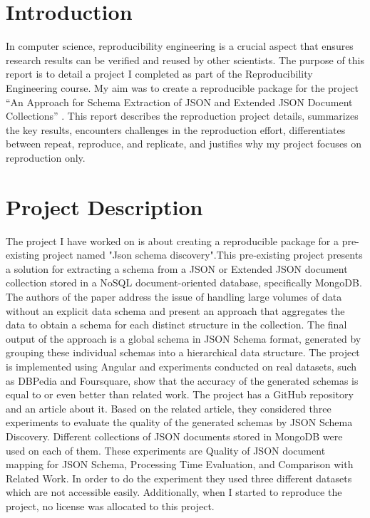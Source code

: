 \documentclass[sigconf]{acmart}
\begin{document}
% 
\section*{Introduction}
In computer science, reproducibility engineering is a crucial aspect that ensures research results can be verified and reused by other scientists. The purpose of this report is to detail a project I completed as part of the Reproducibility Engineering course. My aim was to create a reproducible package for the project ``An Approach for Schema Extraction of JSON and Extended JSON Document Collections'' \cite{8424731}. This report describes the reproduction project details, summarizes the key results, encounters challenges in the reproduction effort, differentiates between repeat, reproduce, and replicate, and justifies why my project focuses on reproduction only.


\section*{Project Description}
The project I have worked on is about creating a reproducible package for a pre-existing project named "Json schema discovery".This  pre-existing project presents a solution for extracting a schema from a JSON or Extended JSON document collection stored in a NoSQL document-oriented database, specifically MongoDB. The authors of the paper address the issue of handling large volumes of data without an explicit data schema and present an approach that aggregates the data to obtain a schema for each distinct structure in the collection. The final output of the approach is a global schema in JSON Schema format, generated by grouping these individual schemas into a hierarchical data structure. The project is implemented using Angular and experiments conducted on real datasets, such as DBPedia and Foursquare, show that the accuracy of the generated schemas is equal to or even better than related work.
The project has a GitHub repository and an article about it. Based on the related article, they considered three experiments to evaluate the quality of the generated schemas by JSON Schema Discovery. Different collections of JSON documents stored in MongoDB were used on each of them\cite{8424731}. These experiments are Quality of JSON document mapping for JSON Schema, Processing Time Evaluation, and Comparison with Related Work. In order to do the experiment they used three different datasets which are not accessible easily. Additionally, when I started to reproduce the project, no license was allocated to this project.
\end{document}
